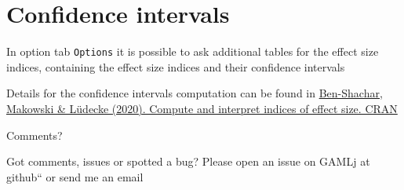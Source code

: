 \documentclass[]{article}
\begin{document}
\hypertarget{confidence-intervals}{%
\section{Confidence intervals}\label{confidence-intervals}}

In option tab \texttt{Options} it is possible to ask additional tables
for the effect size indices, containing the effect size indices and
their confidence intervals

Details for the confidence intervals computation can be found in
\href{https://github.com/easystats/effectsize}{Ben-Shachar, Makowski \&
Lüdecke (2020). Compute and interpret indices of effect size. CRAN}

Comments?

Got comments, issues or spotted a bug? Please open an issue on GAMLj at
github`` or send me an email
\end{document}
